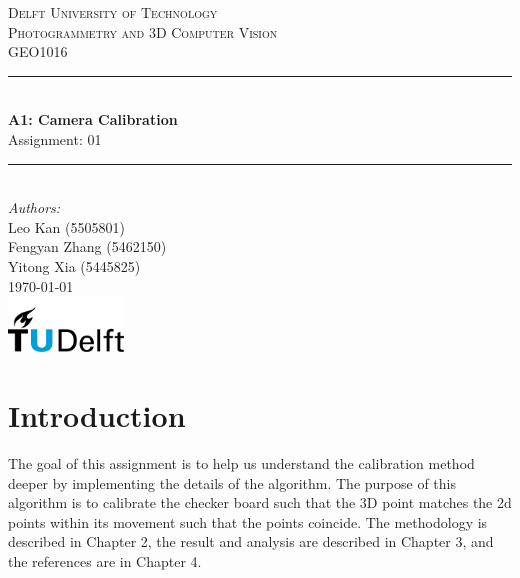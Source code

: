 \documentclass[a4paper]{article}
\begin{document}
\begin{titlepage}

\newcommand{\HRule}{\rule{\linewidth}{0.5mm}} 							%
\center 
 
\textsc{\LARGE Delft University of Technology}\\[1cm]

\textsc{\Large Photogrammetry and 3D Computer Vision}\\[0.2cm]
\textsc{\large GEO1016 }\\[1cm] %
\HRule \\[0.8cm]
{ \huge \bfseries A1: Camera Calibration}\\[0.2cm] %
{Assignment: 01}\\[0.7cm] %
\HRule \\[2cm]
\large
\emph{Authors:}\\
Leo Kan (5505801)\\
Fengyan Zhang (5462150)\\	
Yitong Xia (5445825) \\ [1.5cm]%
{\large \today}\\[5cm] 
\includegraphics[width=0.23\textwidth]{images/TUDelft_Logo-1.png}\\[0.7cm] 	%
\vfill 
\end{titlepage}




\section{Introduction}
The goal of this assignment is to help us understand the calibration method deeper by implementing the details of the algorithm. The purpose of this algorithm is to calibrate the checker board such that the 3D point matches the 2d points within its movement such that the points coincide. The methodology is described in Chapter 2, the result and analysis are described in Chapter 3, and the references are in Chapter 4.
\end{document}
